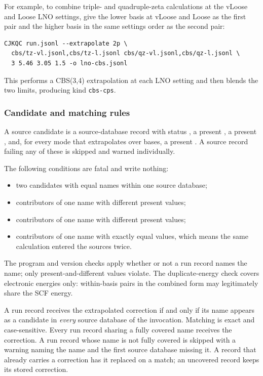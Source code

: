 For example, to combine triple- and quadruple-zeta calculations at the
vLoose and Loose LNO settings, give the lower basis at vLoose and Loose as
the first pair and the higher basis in the same settings order as the second
pair:

\begin{verbatim}
CJKQC run.jsonl --extrapolate 2p \
  cbs/tz-vl.jsonl,cbs/tz-l.jsonl cbs/qz-vl.jsonl,cbs/qz-l.jsonl \
  3 5.46 3.05 1.5 -o lno-cbs.jsonl
\end{verbatim}

This performs a CBS(3,4) extrapolation at each LNO setting and then blends
the two limits, producing kind \texttt{cbs-cps}.

\subsubsection*{Candidate and matching rules}

A source candidate is a source-database record with status , a
present , a present , and, for every mode
that extrapolates over bases, a present \fld{scf_energy}. A source record
failing any of these is skipped and warned individually.

The following conditions are fatal and write nothing:

\begin{itemize}
  \item two candidates with equal names within one source database;
  \item contributors of one name with different present 
        values;
  \item contributors of one name with different present
         values;
  \item contributors of one name with exactly equal 
        values, which means the same calculation entered the sources twice.
\end{itemize}

The program and version checks apply whether or not a run record names the
name; only present-and-different values violate. The duplicate-energy check
covers electronic energies only: within-basis pairs in the combined form may
legitimately share the SCF energy.

A run record receives the extrapolated correction if and only if its name
appears as a candidate in \emph{every} source database of the invocation.
Matching is exact and case-sensitive. Every run record sharing a fully
covered name receives the correction. A run record whose name is not fully
covered is skipped with a warning naming the name and the first source
database missing it. A record that already carries a correction has it
replaced on a match; an uncovered record keeps its stored correction.

